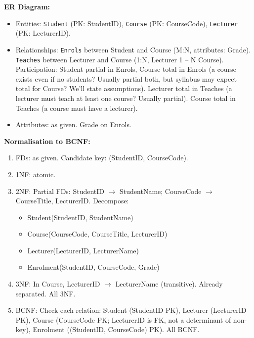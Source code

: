 \documentclass[11pt]{article}
\begin{document}
\begin{corrige}[Exercise 1]
\textbf{ER Diagram:}
\begin{itemize}
\item Entities: \texttt{Student} (PK: StudentID), \texttt{Course} (PK: CourseCode), \texttt{Lecturer} (PK: LecturerID).
\item Relationships: \texttt{Enrols} between Student and Course (M:N, attributes: Grade). \texttt{Teaches} between Lecturer and Course (1:N, Lecturer 1 -- N Course). Participation: Student partial in Enrols, Course total in Enrols (a course exists even if no students? Usually partial both, but syllabus may expect total for Course? We'll state assumptions). Lecturer total in Teaches (a lecturer must teach at least one course? Usually partial). Course total in Teaches (a course must have a lecturer).
\item Attributes: as given. Grade on Enrols.
\end{itemize}
\end{corrige}

\begin{corrige}[Exercise 2]
\textbf{Normalisation to BCNF:}
\begin{enumerate}
\item FDs: as given. Candidate key: (StudentID, CourseCode).
\item 1NF: atomic.
\item 2NF: Partial FDs: StudentID $\rightarrow$ StudentName; CourseCode $\rightarrow$ CourseTitle, LecturerID. Decompose:
\begin{itemize}
\item Student(StudentID, StudentName)
\item Course(CourseCode, CourseTitle, LecturerID)
\item Lecturer(LecturerID, LecturerName)
\item Enrolment(StudentID, CourseCode, Grade)
\end{itemize}
\item 3NF: In Course, LecturerID $\rightarrow$ LecturerName (transitive). Already separated. All 3NF.
\item BCNF: Check each relation: Student (StudentID PK), Lecturer (LecturerID PK), Course (CourseCode PK; LecturerID is FK, not a determinant of non-key), Enrolment ((StudentID, CourseCode) PK). All BCNF.
\end{enumerate}
\end{corrige}
\end{document}
